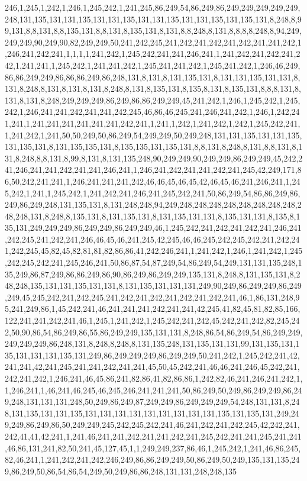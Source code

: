 246,1,245,1,242,1,246,1,245,242,1,241,245,86,249,54,86,249,86,249,249,249,249,249,248,131,135,131,131,135,131,131,135,131,131,135,131,131,135,131,135,131,8,248,8,99,131,8,8,131,8,8,135,131,8,8,131,8,135,131,8,131,8,8,248,8,131,8,8,8,8,248,8,94,249,249,249,90,249,90,82,249,249,50,241,242,245,241,242,241,242,241,242,241,241,242,1,246,241,242,241,1,1,1,1,241,242,1,245,242,241,241,246,241,1,241,242,241,242,241,242,1,241,241,1,245,242,1,241,241,242,1,245,241,241,242,1,245,241,242,1,246,46,249,86,86,249,249,86,86,86,249,86,248,131,8,131,8,131,135,131,8,131,131,135,131,131,8,131,8,248,8,131,8,131,8,131,8,248,8,131,8,135,131,8,135,8,131,8,135,131,8,8,8,131,8,131,8,131,8,248,249,249,249,86,249,86,86,249,249,45,241,242,1,246,1,245,242,1,245,242,1,246,241,241,242,241,241,242,245,46,86,46,245,241,246,241,242,1,246,1,242,241,241,1,241,241,241,241,241,241,242,241,1,241,1,242,1,241,242,1,242,1,245,242,241,1,241,242,1,241,50,50,249,50,86,249,54,249,249,50,249,248,131,131,135,131,131,135,131,135,131,8,131,135,135,131,8,135,135,131,135,131,8,8,131,8,248,8,131,8,8,131,8,131,8,248,8,8,131,8,99,8,131,8,131,135,248,90,249,249,90,249,249,86,249,249,45,242,241,246,241,241,242,241,241,246,241,1,246,241,242,241,241,242,241,245,42,249,171,86,50,242,241,241,1,246,241,241,241,242,46,46,45,46,45,42,46,45,46,241,246,241,1,245,242,1,241,1,245,242,1,241,242,241,246,241,245,242,241,50,86,249,54,86,86,249,86,249,86,249,248,131,135,131,8,131,248,248,94,249,248,248,248,248,248,248,248,248,248,248,131,8,248,8,135,131,8,131,135,131,8,131,135,131,131,8,135,131,131,8,135,8,135,131,249,249,249,86,249,249,86,249,249,46,1,245,242,241,242,241,242,241,246,241,242,245,241,242,241,246,46,45,46,241,245,42,245,46,46,245,242,245,242,241,242,241,242,245,45,82,45,82,81,81,82,86,86,41,242,246,241,1,241,242,1,246,1,241,242,1,245,242,245,242,241,245,246,241,50,86,87,54,87,249,54,86,249,54,249,131,131,135,248,135,249,86,87,249,86,86,249,86,90,86,249,86,249,249,135,131,8,248,8,131,135,131,8,248,248,135,131,131,135,131,131,8,131,135,131,131,131,249,90,249,86,249,249,86,249,249,45,245,242,241,242,245,241,242,241,242,241,242,241,242,241,46,1,86,131,248,95,241,249,86,1,45,242,241,46,241,241,241,242,241,241,42,245,41,82,45,81,82,85,166,122,241,241,242,241,46,1,245,1,241,242,1,245,242,241,242,45,242,241,242,82,245,242,50,90,86,54,86,249,86,55,86,249,249,135,131,131,8,248,86,54,86,249,54,86,249,249,249,249,249,86,248,131,8,248,8,248,8,131,135,248,131,135,131,131,99,131,135,131,135,131,131,131,135,131,249,86,249,249,249,86,249,249,50,241,242,1,245,242,241,42,241,241,42,241,245,241,241,242,241,241,45,50,45,242,241,46,46,241,246,45,242,241,242,241,242,1,246,241,46,45,86,241,82,86,41,82,86,86,1,242,82,46,241,246,241,242,1,1,246,241,1,46,241,46,245,46,245,246,241,241,241,50,86,249,50,249,86,249,249,86,249,248,131,131,131,248,50,249,86,249,87,249,249,86,249,249,249,54,248,131,131,8,248,131,135,131,131,135,131,131,131,131,131,131,131,131,131,135,131,135,131,249,249,249,86,249,86,50,249,249,245,242,245,242,241,46,241,242,241,242,245,42,242,241,242,41,41,42,241,1,241,46,241,241,242,241,241,242,241,245,242,241,241,245,241,241,46,86,131,241,82,50,241,45,127,45,1,1,249,249,237,86,46,1,245,242,1,241,46,86,245,82,46,241,1,241,242,241,242,246,249,86,86,249,249,50,86,249,50,249,135,131,135,249,86,249,50,86,54,86,54,249,50,249,86,86,248,131,131,248,248,135